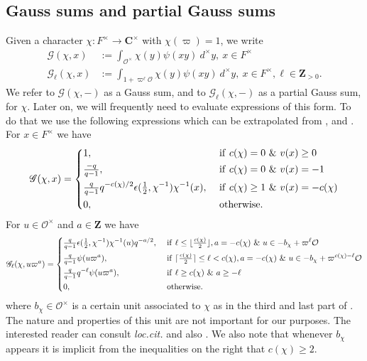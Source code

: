 \documentclass{amsart}
\theoremstyle{plain}
\theoremstyle{plain}
\theoremstyle{remark}
\begin{document}
\subsection{Gauss sums and partial Gauss sums}\label{sec Gauss sums}
Given a character $\chi:F^\times\rightarrow\mathbf{C}^\times$ with $\chi(\varpi)=1$, we write 
\begin{align*}\mathscr{G}(\chi,x)&:=\int_{\mathcal{O}^\times}\chi(y)\psi(xy)\ d^\times y,\ x\in F^\times\\
\mathscr{G}_{\ell}(\chi,x)&:=\int_{1+\varpi^\ell\mathcal{O}}\chi(y)\psi(xy)\ d^\times y,\ x\in F^\times,\ell\in\mathbf{Z}_{>0}.
\end{align*}
We refer to $\mathscr{G}(\chi,-)$ as a Gauss sum, and to $\mathscr{G}_\ell(\chi,-)$ as a partial Gauss sum, for $\chi$. Later on, we will frequently need to evaluate expressions of this form. To do that we use the following expressions which can be extrapolated from \cite[Lemma $2.3$]{Corbett_2018}, \cite[$1.3.1$]{Assing_2019}  and \cite[Remark $3.3.7$]{Assing_2019}. For $x\in F^\times$ we have 
\begin{align*}
    \mathscr{G}(\chi,x)=\begin{dcases}
        1,\ &\mathrm{if}\ c(\chi)=0\ \&\ v(x)\geq 0\\
        \tfrac{-q}{q-1},\ &\mathrm{if}\ c(\chi)=0\ \&\ v(x)=-1\\
        \tfrac{q}{q-1}q^{-c(\chi)/2}\epsilon(\tfrac{1}{2},\chi^{-1})\chi^{-1}(x),\ &\mathrm{if}\ c(\chi)\geq 1\ \&\ v(x)=-c(\chi)\\
        0,\ &\mathrm{otherwise.}
    \end{dcases}
\end{align*}
For $u\in\mathcal{O}^\times$ and $a\in\mathbf{Z}$ we have
\begin{align*}
    \mathscr{G}_\ell(\chi,u\varpi^{a})=\begin{dcases}
        \tfrac{q}{q-1}\epsilon(\tfrac{1}{2},\chi^{-1})\chi^{-1}(u)q^{-a/2},\ &\mathrm{if}\ \ell\leq \lfloor\tfrac{c(\chi)}{2}\rfloor, a=-c(\chi) \ \&\ u\in-b_\chi+\varpi^\ell\mathcal{O}\\
        \tfrac{q}{q-1}\psi(u\varpi^a),\ &\mathrm{if}\ \lceil\tfrac{c(\chi)}{2}\rceil\leq \ell <c(\chi), a=-c(\chi)\  \&\ u\in-b_\chi+\varpi^{c(\chi)-\ell}\mathcal{O}\\
        \tfrac{q}{q-1}q^{-\ell}\psi(u\varpi^a),\ &\mathrm{if}\ \ell\geq c(\chi)\ \&\ a\geq -\ell\\
        0,\ &\mathrm{otherwise.}
    \end{dcases}
\end{align*}
where $b_\chi\in\mathcal{O}^\times$ is a certain unit associated to $\chi$ as in the third and last part of \cite[Lemma $4.1$]{Assing_2018}. The nature and properties of this unit are not important for our purposes. The interested reader can consult \textit{loc.cit.} and also \cite[Lemma $2.4$]{cesnavicius2022manin}. We also note that whenever $b_\chi$ appears it is implicit from the inequalities on the right that $c(\chi)\geq 2$.
\end{document}
